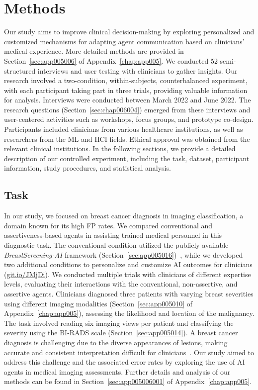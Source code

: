 \section{Methods}
\label{sec:chap006005}

Our study aims to improve clinical decision-making by exploring personalized and customized mechanisms for adapting agent communication based on clinicians' medical experience.
More detailed methods are provided in Section~\ref{sec:app005006} of Appendix~\ref{chap:app005}.
We conducted 52 semi-structured interviews and user testing with clinicians to gather insights.
Our research involved a two-condition, within-subjects, counterbalanced experiment, with each participant taking part in three trials, providing valuable information for analysis.
Interviews were conducted between March 2022 and June 2022.
The research questions (Section~\ref{sec:chap006004}) emerged from these interviews and user-centered activities such as workshops, focus groups, and prototype co-design.
Participants included clinicians from various healthcare institutions, as well as researchers from the \ac{ML} and \ac{HCI} fields.
Ethical approval was obtained from the relevant clinical institutions.
In the following sections, we provide a detailed description of our controlled experiment, including the task, dataset, participant information, study procedures, and statistical analysis.

\subsection{Task}
\label{sec:chap006005001}

In our study, we focused on breast cancer diagnosis in imaging classification, a domain known for its high \ac{FP} rates.
We compared conventional and assertiveness-based agents in assisting trained medical personnel in this diagnostic task.
The conventional condition utilized the publicly available {\it BreastScreening-AI} framework (Section~\ref{sec:app005016})~\cite{CALISTO2022102285}, while we developed two additional conditions to personalize and customize \ac{AI} outcomes for clinicians (\href{https://mida-project.github.io/prototype-multi-modality-assistant/}{git.io/JMjDi}).
We conducted multiple trials with clinicians of different expertise levels, evaluating their interactions with the conventional, non-assertive, and assertive agents.
Clinicians diagnosed three patients with varying breast severities using different imaging modalities (Section~\ref{sec:app005010} of Appendix~\ref{chap:app005}), assessing the likelihood and location of the malignancy.
The task involved reading six imaging views per patient and classifying the severity using the \ac{BI-RADS} scale (Section~\ref{sec:app005014}).
A breast cancer diagnosis is challenging due to the diverse appearances of lesions, making accurate and consistent interpretation difficult for clinicians~\cite{CALISTO2022102285}.
Our study aimed to address this challenge and the associated error rates by exploring the use of \ac{AI} agents in medical imaging assessments.
Further details and analysis of our methods can be found in Section~\ref{sec:app005006001} of Appendix~\ref{chap:app005}.


